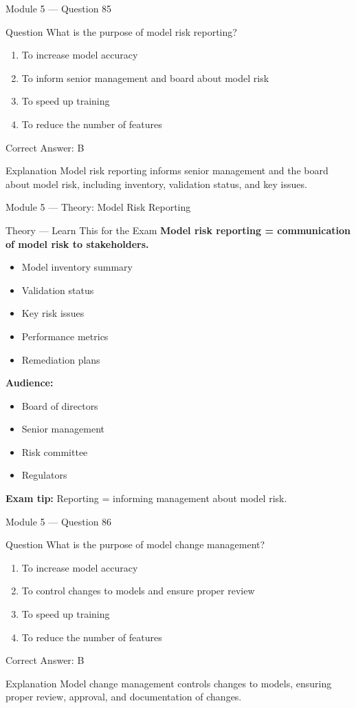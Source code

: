 \documentclass[aspectratio=169,10pt]{beamer}
\newcommand{\question}[1]{%
	\begin{block}{Question}
		#1
	\end{block}
}
\newcommand{\options}[4]{%
	\begin{enumerate}[label=\Alph*.,leftmargin=*]
		\item #1
		\item #2
		\item #3
		\item #4
	\end{enumerate}
}
\newcommand{\answerbox}[1]{%
	\begin{exampleblock}{Correct Answer: #1}
	\end{exampleblock}
}
\newcommand{\explain}[1]{%
	\begin{block}{Explanation}
		\small #1
	\end{block}
}
\newcommand{\theory}[1]{%
	\begin{block}{Theory --- Learn This for the Exam}
		\small #1
	\end{block}
}
\begin{document}
	\begin{frame}{Module 5 --- Question 85}
		\question{What is the purpose of model risk reporting?}
		\options{To increase model accuracy}{To inform senior management and board about model risk}{To speed up training}{To reduce the number of features}
		\answerbox{B}
		\explain{Model risk reporting informs senior management and the board about model risk, including inventory, validation status, and key issues.}
	\end{frame}
	
	\begin{frame}{Module 5 --- Theory: Model Risk Reporting}
		\theory{
			\textbf{Model risk reporting = communication of model risk to stakeholders.}
			\begin{itemize}
				\item Model inventory summary
				\item Validation status
				\item Key risk issues
				\item Performance metrics
				\item Remediation plans
			\end{itemize}
			\textbf{Audience:}
			\begin{itemize}
				\item Board of directors
				\item Senior management
				\item Risk committee
				\item Regulators
			\end{itemize}
			\textbf{Exam tip:} Reporting = informing management about model risk.
		}
	\end{frame}
	
	\begin{frame}{Module 5 --- Question 86}
		\question{What is the purpose of model change management?}
		\options{To increase model accuracy}{To control changes to models and ensure proper review}{To speed up training}{To reduce the number of features}
		\answerbox{B}
		\explain{Model change management controls changes to models, ensuring proper review, approval, and documentation of changes.}
	\end{frame}
	
\end{document}
